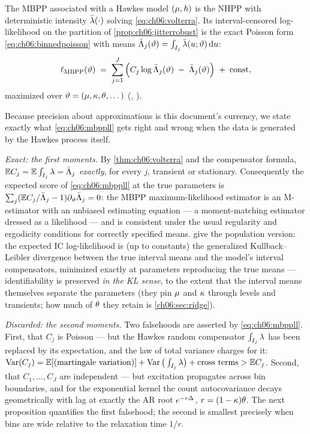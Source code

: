 \begin{definition}\label{def:ch06:mbpp}
The MBPP associated with a Hawkes model $(\mu,h)$ is the NHPP with
deterministic intensity $\bar{\lambda}(\cdot)$ solving
\cref{eq:ch06:volterra}. Its interval-censored log-likelihood on the
partition of \cref{prop:ch06:jitterrobust} is the exact Poisson form
\cref{eq:ch06:binnedpoisson} with means
$\bar{\Lambda}_j(\vartheta) = \int_{I_j}\bar{\lambda}(u;\vartheta)\,\mathrm{d} u$:
\begin{equation}\label{eq:ch06:mbppll}
\ell_{\mathrm{MBPP}}(\vartheta)
 \;=\;
 \sum_{j=1}^{J} \Big( C_j \log \bar{\Lambda}_j(\vartheta)
 \;-\; \bar{\Lambda}_j(\vartheta) \Big) \;+\; \text{const},
\end{equation}
maximized over $\vartheta = (\mu, \kappa, \theta, \dots)$
(, ).
\end{definition}

Because precision about approximations is this document's currency, we
state exactly what \cref{eq:ch06:mbppll} gets right and wrong when the data
is generated by the Hawkes process itself.

\emph{Exact: the first moments.} By \cref{thm:ch06:volterra} and the
compensator formula, $\mathbb{E} C_j = \mathbb{E}\int_{I_j}\lambda = \bar{\Lambda}_j$
\emph{exactly}, for every $j$, transient or stationary. Consequently the
expected score of \cref{eq:ch06:mbppll} at the true parameters is
$\sum_j (\mathbb{E} C_j/\bar{\Lambda}_j - 1)\partial_{\vartheta}\bar{\Lambda}_j = 0$: the
MBPP maximum-likelihood estimator is an M-estimator with an unbiased
estimating equation --- a moment-matching estimator dressed as a
likelihood --- and is consistent under the usual regularity and ergodicity
conditions for correctly specified means. \citet[Prop.~8]{rizoiu2022} give
the population version: the expected IC log-likelihood is (up to constants)
the generalized Kullback--Leibler divergence between the true interval
means and the model's interval compensators, minimized exactly at
parameters reproducing the true means --- identifiability is preserved
\emph{in the KL sense}, to the extent that the interval means themselves
separate the parameters (they pin $\mu$ and $\kappa$ through levels and
transients; how much of $\theta$ they retain is
\cref{ch06:sec:ridge}).

\emph{Discarded: the second moments.} Two falsehoods are asserted by
\cref{eq:ch06:mbppll}. First, that $C_j$ is Poisson --- but the Hawkes
random compensator $\int_{I_j}\lambda$ has been replaced by its expectation,
and the law of total variance charges for it:
$\operatorname{Var}(C_j) = \mathbb{E}[\text{(martingale variation)}] + \operatorname{Var}\big(\textstyle
\int_{I_j}\lambda\big) + \text{cross terms} > \mathbb{E} C_j$. Second, that
$C_1,\dots,C_J$ are independent --- but excitation propagates across bin
boundaries, and for the exponential kernel the count autocovariance decays
geometrically with lag at exactly the AR root $e^{-r\Delta}$,
$r = (1-\kappa)\theta$. The next proposition quantifies the first
falsehood; the second is smallest precisely when bins are wide relative to
the relaxation time $1/r$.

